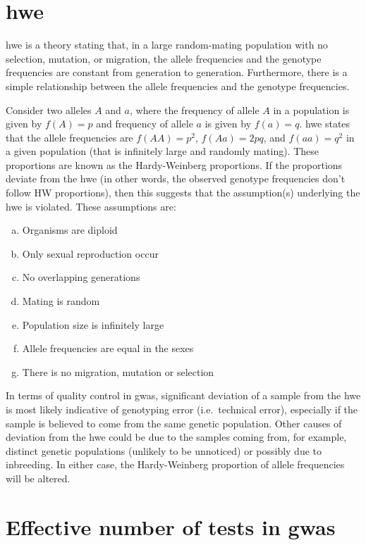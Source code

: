 \section{\Acrfull{hwe}}
\label{sec:hwe}

\Gls{hwe} is a theory stating that, in a large random-mating population with no selection, mutation, or migration, the allele frequencies and the genotype frequencies are constant from generation to generation.
Furthermore, there is a simple relationship between the allele frequencies and the genotype frequencies.

Consider two alleles $A$ and $a$, where the frequency of allele $A$ in a population is given by $f(A) = p$ and frequency of allele $a$ is given by $f(a) = q$.
\Gls{hwe} states that the allele frequencies are $f(AA) = p^2$, $f(Aa) = 2pq$, and $f(aa) = q^2$ in a given population (that is infinitely large and randomly mating).
These proportions are known as the Hardy-Weinberg proportions.
If the proportions deviate from the \gls{hwe} (in other words, the observed genotype frequencies don't follow HW proportions), then this suggests that the assumption(s) underlying the \gls{hwe} is violated.
These assumptions are:
\begin{enumerate}[(a),noitemsep]
	\item Organisms are diploid
	\item Only sexual reproduction occur
	\item No overlapping generations
	\item Mating is random
	\item Population size is infinitely large
	\item Allele frequencies are equal in the sexes
	\item There is no migration, mutation or selection
\end{enumerate}

In terms of quality control in \gls{gwas}, significant deviation of a sample from the \gls{hwe} is most likely indicative of genotyping error (i.e.\ technical error), especially if the sample is believed to come from the same genetic population.
Other causes of deviation from the \gls{hwe} could be due to the samples coming from, for example,  distinct genetic populations (unlikely to be unnoticed) or possibly due to inbreeding.
In either case, the Hardy-Weinberg proportion of allele frequencies will be altered.

\section{Effective number of tests in \gls{gwas}}
\label{sec:effective_number_of_tests_in_gwas}

